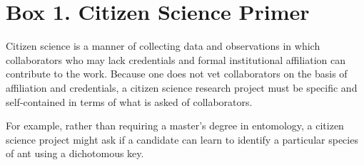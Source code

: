 \section{Box 1. Citizen Science Primer}

Citizen science is a manner of collecting data and observations in which collaborators who may lack credentials and formal institutional affiliation can contribute to the work. Because one does not vet collaborators on the basis of affiliation and credentials, a citizen science research project must be specific and self-contained in terms of what is asked of collaborators.

For example, rather than requiring a master's degree in entomology, a citizen science project might ask if a candidate can learn to identify a particular species of ant using a dichotomous key.
